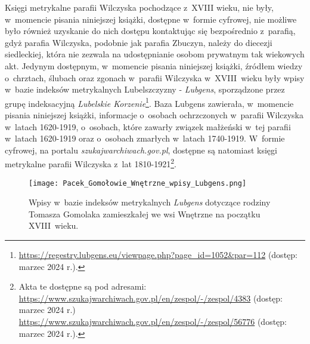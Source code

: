 Księgi metrykalne parafii Wilczyska pochodzące z~XVIII wieku, nie były, 
w~momencie pisania niniejszej książki, dostępne w~formie cyfrowej, nie 
możliwe było również uzyskanie do nich dostępu kontaktując się bezpośrednio 
z~parafią, gdyż parafia Wilczyska, podobnie jak parafia Zbuczyn, należy do 
diecezji siedleckiej, która nie zezwala na udostępnianie osobom prywatnym tak 
wiekowych akt. Jedynym dostępnym, w~momencie pisania niniejszej książki, 
źródłem wiedzy o~chrztach, ślubach oraz zgonach w~parafii Wilczyska 
w~XVIII~wieku były wpisy w~bazie indeksów metrykalnych Lubelszczyzny - 
\emph{Lubgens}, sporządzone przez grupę indeksacyjną \emph{Lubelskie 
Korzenie}\footnote{
    \url{https://regestry.lubgens.eu/viewpage.php?page_id=1052&par=112} 
    (dostęp: marzec 2024 r.).}. Baza Lubgens zawierała, w~momencie pisania 
    niniejszej książki, informacje o~osobach ochrzczonych w~parafii Wilczyska 
    w~latach 1620-1919, o~osobach, które zawarły związek małżeński w~tej 
    parafii w~latach 1620-1919 oraz o~osobach zmarłych w~latach 1740-1919. 
    W~formie cyfrowej, na portalu \emph{szukajwarchiwach.gov.pl}, dostępne 
    są natomiast księgi metrykalne parafii Wilczyska z~lat 
    1810-1921\footnote{Akta te dostępne są pod adresami: \\ 
    \url{https://www.szukajwarchiwach.gov.pl/en/zespol/-/zespol/4383} 
    (dostęp: marzec 2024 r.) \\ 
    \url{https://www.szukajwarchiwach.gov.pl/en/zespol/-/zespol/56776} 
    (dostęp: marzec 2024 r.).}.

\begin{figure}[!ht]
    \vspace*{0.5cm}
    \centering \texttt{[image: 
        Pacek\_Gomołowie\_Wnętrzne\_wpisy\_Lubgens.png]}
    \captionsetup{format=hang}
    \caption{Wpisy w~bazie indeksów metrykalnych \emph{Lubgens} dotyczące 
    rodziny Tomasza Gomolaka zamieszkałej we wsi Wnętrzne na początku 
    XVIII~wieku.}
    \label{fig:pacek_gomola_lubgens}
\end{figure}

